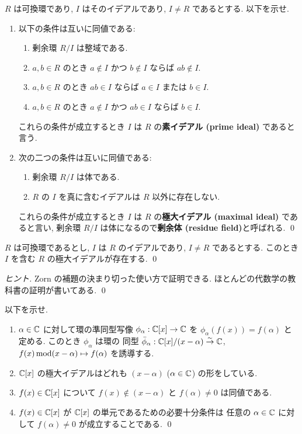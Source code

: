 \documentclass[12pt,twoside]{jarticle}
\begin{document}
\begin{question}[素イデアルと極大イデアルの定義]
 $R$ は可換環であり, 
 $I$ はそのイデアルであり, $I\ne R$ であるとする. 
 以下を示せ.
 \begin{enumerate}
 \item 以下の条件は互いに同値である:
  \begin{enumerate}
   \item 剰余環 $R/I$ は整域である.
   \item $a,b\in R$ のとき $a\not\in I$ かつ $b\not\in I$ ならば $ab\not\in I$.
   \item $a,b\in R$ のとき $ab\in I$ ならば $a\in I$ または $b\in I$.
   \item $a,b\in R$ のとき $a\not\in I$ かつ $ab\in I$ ならば $b\in I$.
  \end{enumerate}
  これらの条件が成立するとき $I$ は $R$ の{\bf 素イデアル (prime ideal)} 
  であると言う.
 \item 次の二つの条件は互いに同値である:
  \begin{enumerate}
   \item 剰余環 $R/I$ は体である.
   \item $R$ の $I$ を真に含むイデアルは $R$ 以外に存在しない.
  \end{enumerate}
  これらの条件が成立するとき $I$ は $R$ の{\bf 極大イデアル (maximal ideal)} 
  であると言い, 
  剰余環 $R/I$ は体になるので{\bf 剰余体 (residue field)}と呼ばれる.
  \qed
 \end{enumerate}
\end{question}

\begin{question}[極大イデアルの存在定理]
 $R$ は可換環であるとし, $I$ は $R$ のイデアルであり, 
 $I\ne R$ であるとする. このとき $I$ を含む $R$ の極大イデアルが存在する.
 \qed
\end{question}

\begin{proof}[ヒント]
 Zorn の補題の決まり切った使い方で証明できる.
 ほとんどの代数学の教科書の証明が書いてある.
 \qed
\end{proof}

\begin{question}[{$\C[x]$} の極大イデアル]
 \label{q:maximal-ideal-of-C[x]}
 以下を示せ.
 \begin{enumerate}
 \item $\alpha\in{\mathbb C}$ に対して環の準同型写像 $\phi_\alpha:{\mathbb C}[x]\to{\mathbb C}$ 
  を $\phi_\alpha(f(x))=f(\alpha)$ と定める.
  このとき $\phi_\alpha$ は環の
  同型 $\bar\phi_\alpha:{\mathbb C}[x]/(x-\alpha)\overset\sim\rightarrow{\mathbb C}$, 
  $f(x)\mathop{\mathrm{mod}}\nolimits(x-\alpha) \mapsto f(\alpha)$ を誘導する.
 \item $\C[x]$ の極大イデアルはどれも $(x-\alpha)$ ($\alpha\in{\mathbb C}$) 
  の形をしている.
 \item $f(x)\in{\mathbb C}[x]$ について $f(x)\not\in (x-\alpha)$ 
  と $f(\alpha)\ne 0$ は同値である.
 \item $f(x)\in{\mathbb C}[x]$ が $\C[x]$ の単元であるための必要十分条件は
  任意の $\alpha\in{\mathbb C}$ に対して $f(\alpha)\ne 0$ が成立することである.
  \qed
 \end{enumerate}
\end{question}
\end{document}
